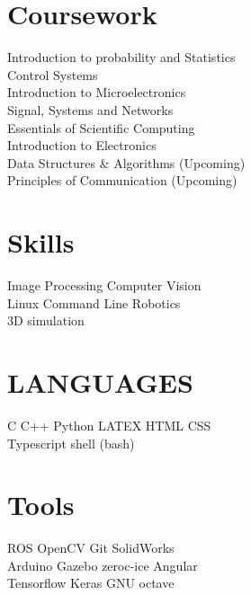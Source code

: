 \documentclass[]{deedy-resume-openfont}
\begin{document}
\begin{minipage}[t]{0.33\textwidth}

\section{Coursework}
Introduction to probability and Statistics \\
Control Systems \\
Introduction to Microelectronics \\
Signal, Systems and Networks \\
Essentials of Scientific Computing \\
Introduction to Electronics \\
Data Structures \& Algorithms (Upcoming) \\
Principles of Communication (Upcoming)
\sectionsep


\section{Skills}
Image Processing \textbullet{} Computer Vision \\
Linux Command Line \textbullet{} Robotics  \\ 
3D simulation
\sectionsep

\section{LANGUAGES}
C \textbullet{}   C++ \textbullet{} Python \textbullet{} LATEX \textbullet{} HTML \textbullet{} CSS \\
Typescript \textbullet{} shell (bash)
\sectionsep

\section{Tools}
ROS \textbullet{} OpenCV \textbullet{} Git \textbullet{} SolidWorks \\ 
Arduino \textbullet{} Gazebo \textbullet{} zeroc-ice \textbullet{} Angular \\
Tensorflow \textbullet{} Keras \textbullet{} GNU octave
\sectionsep
%
%

\end{minipage} 
\hfill
\end{document}
